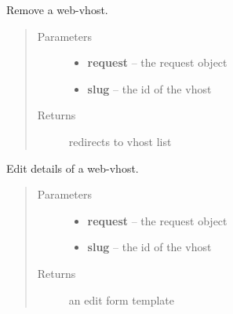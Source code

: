 \documentclass[letterpaper,10pt,english]{sphinxmanual}
\begin{document}

\begin{fulllineitems}
\label{api/web:limeade.web.views.vhost_delete}
Remove a web-vhost.
\begin{quote}\begin{description}
\item[{Parameters}] \leavevmode\begin{itemize}
\item {} 
\textbf{request} -- the request object

\item {} 
\textbf{slug} -- the id of the vhost

\end{itemize}

\item[{Returns}] \leavevmode
redirects to vhost list

\end{description}\end{quote}

\end{fulllineitems}


\begin{fulllineitems}
\label{api/web:limeade.web.views.vhost_edit}
Edit details of a web-vhost.
\begin{quote}\begin{description}
\item[{Parameters}] \leavevmode\begin{itemize}
\item {} 
\textbf{request} -- the request object

\item {} 
\textbf{slug} -- the id of the vhost

\end{itemize}

\item[{Returns}] \leavevmode
an edit form template

\end{description}\end{quote}

\end{fulllineitems}
\end{document}

